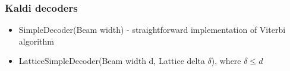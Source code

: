 \subsubsection*{Kaldi decoders} %
\begin{itemize}
    \item SimpleDecoder(Beam width) - straightforward implementation of Viterbi algorithm
    \item LatticeSimpleDecoder(Beam width d, Lattice delta $\delta$), where $ \delta \le d$

\end{itemize}



